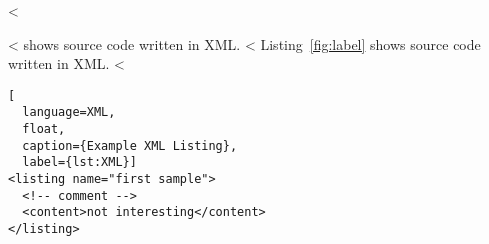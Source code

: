 <%

\begin{WSample}
<%
 shows source code written in XML.
<%
Listing~\ref{fig:label} shows source code written in XML.
<%

\begin{lstlisting}[
  language=XML,
  float,
  caption={Example XML Listing},
  label={lst:XML}]
<listing name="first sample">
  <!-- comment -->
  <content>not interesting</content>
</listing>
\end{lstlisting}
\end{WSample}
\PexaShowBoth{}
